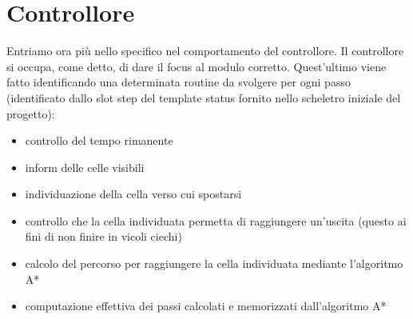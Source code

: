 \section{Controllore} \label{sec:controllore}
Entriamo ora più nello specifico nel comportamento del controllore. Il controllore si occupa, come detto, di dare il focus al modulo corretto. Quest'ultimo viene fatto identificando una determinata routine da svolgere per ogni passo (identificato dallo slot step del template status fornito nello scheletro iniziale del progetto):
\begin{itemize}
	\item controllo del tempo rimanente
	\item inform delle celle visibili
	\item individuazione della cella verso cui spostarsi
	\item controllo che la cella individuata permetta di raggiungere un'uscita (questo ai fini di non finire in vicoli ciechi)
	\item calcolo del percorso per raggiungere la cella individuata mediante l'algoritmo A*
	\item computazione effettiva dei passi calcolati e memorizzati dall'algoritmo A*
\end{itemize}
